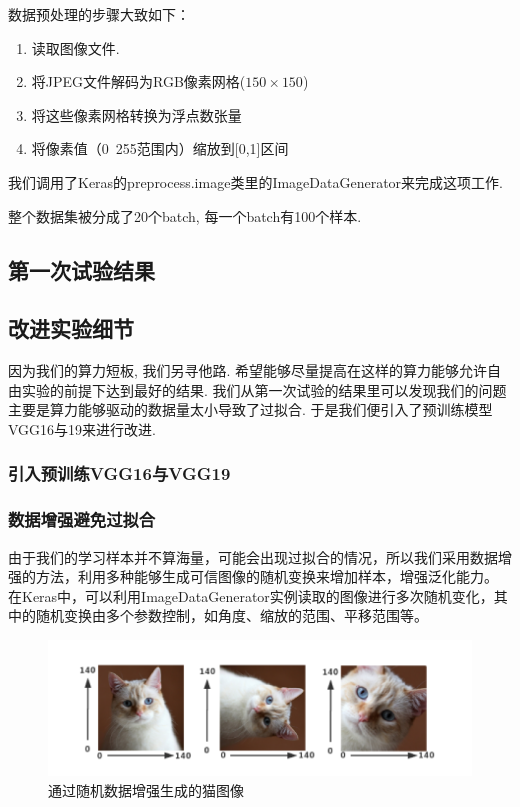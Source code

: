 \documentclass[lang=cn,11pt]{elegantpaper}
\begin{document}
  数据预处理的步骤大致如下：

\begin{enumerate}
	\item 读取图像文件.
	\item 将JPEG文件解码为RGB像素网格($150\times 150$)
	\item 将这些像素网格转换为浮点数张量
	\item 将像素值（0~255范围内）缩放到[0,1]区间
\end{enumerate}

我们调用了Keras的preprocess.image类里的ImageDataGenerator来完成这项工作.

整个数据集被分成了20个batch, 每一个batch有100个样本.

\subsection{第一次试验结果}


\subsection{改进实验细节}

因为我们的算力短板, 我们另寻他路. 希望能够尽量提高在这样的算力能够允许自由实验的前提下达到最好的结果. 我们从第一次试验的结果里可以发现我们的问题主要是算力能够驱动的数据量太小导致了过拟合. 于是我们便引入了预训练模型VGG16与19来进行改进.


\subsubsection{引入预训练VGG16与VGG19}




\subsubsection{数据增强避免过拟合}
由于我们的学习样本并不算海量，可能会出现过拟合的情况，所以我们采用数据增强的方法，利用多种能够生成可信图像的随机变换来增加样本，增强泛化能力。 在Keras中，可以利用ImageDataGenerator实例读取的图像进行多次随机变化，其中的随机变换由多个参数控制，如角度、缩放的范围、平移范围等。

\begin{figure}[hbtp]
\centering
  \includegraphics{aug.png}
  \caption{通过随机数据增强生成的猫图像\label{fig:augcat}}
\end{figure}
\end{document}
